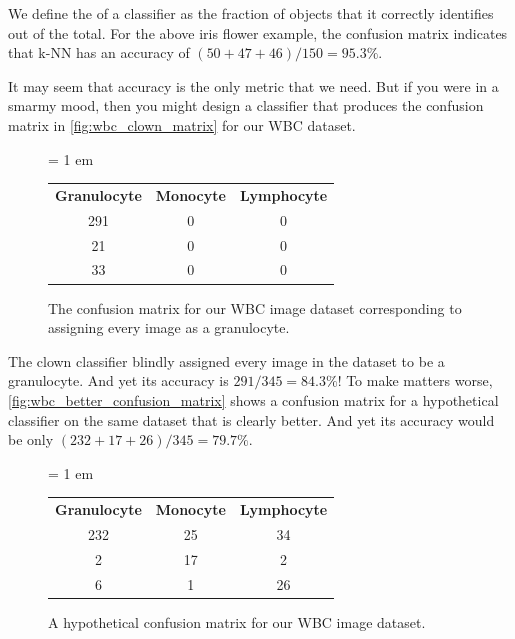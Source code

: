 \begin{note}\end{note}

We define the  of a classifier as the fraction of objects that it correctly identifies out of the total. For the above iris flower example, the confusion matrix indicates that k-NN has an accuracy of $(50 + 47 + 46)/150 = 95.3\%$.

It may seem that accuracy is the only metric that we need. But if you were in a smarmy mood, then you might design a classifier that produces the confusion matrix in \autoref{fig:wbc_clown_matrix} for our WBC dataset.\\

\begin{figure}[h]
\centering
\tabcolsep = 1 em
\mySfFamily
\begin{tabular}{c c c}
\textbf{Granulocyte} & \textbf{Monocyte} & \textbf{Lymphocyte} \\
291 & 0 & 0 \\
21 & 0 & 0 \\
33 & 0 & 0
\end{tabular}
\caption{The confusion matrix for our WBC image dataset corresponding to assigning every image as a granulocyte.}
\label{fig:wbc_clown_matrix}
\end{figure}

\begin{qbox}\end{qbox}

The clown classifier blindly assigned every image in the dataset to be a granulocyte. And yet its accuracy is $291/345 = 84.3\%$! To make matters worse, \autoref{fig:wbc_better_confusion_matrix} shows a confusion matrix for a hypothetical classifier on the same dataset that is clearly better. And yet its accuracy would be only $(232 + 17 + 26)/345 = 79.7\%$.\\

\begin{figure}[h]
\centering
\tabcolsep = 1 em
\mySfFamily
\begin{tabular}{c c c}
\textbf{Granulocyte} & \textbf{Monocyte} & \textbf{Lymphocyte} \\
232 & 25 & 34 \\
2 & 17 & 2 \\
6 & 1 & 26
\end{tabular}
\caption{A hypothetical confusion matrix for our WBC image dataset.}
\label{fig:wbc_better_confusion_matrix}
\end{figure}

